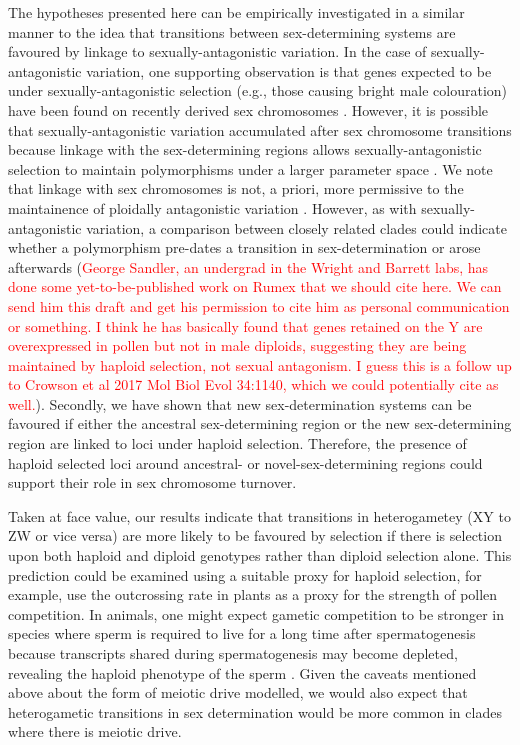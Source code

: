 \documentclass[12pt]{article}
\begin{document}
The hypotheses presented here can be empirically investigated in a similar manner to the idea that transitions between sex-determining systems are favoured by linkage to sexually-antagonistic variation. 
In the case of sexually-antagonistic variation, one supporting observation is that genes expected to be under sexually-antagonistic selection (e.g., those causing bright male colouration) have been found on recently derived sex chromosomes \citep{Lindholm:2002dw,Tripathi:2009cw,Ser:2010iq}.
However, it is possible that sexually-antagonistic variation accumulated after sex chromosome transitions because linkage with the sex-determining regions allows sexually-antagonistic selection to maintain polymorphisms under a larger parameter space \citep{Rice:1987hs,Jordan:2011fj}.
We note that linkage with sex chromosomes is not, a priori, more permissive to the maintainence of ploidally antagonistic variation \citep{Immler:2012tl}.
However, as with sexually-antagonistic variation, a comparison between closely related clades could indicate whether a polymorphism pre-dates a transition in sex-determination or arose afterwards (\textcolor{red}{George Sandler, an undergrad in the Wright and Barrett labs, has done some yet-to-be-published work on Rumex that we should cite here. We can send him this draft and get his permission to cite him as personal communication or something. I think he has basically found that genes retained on the Y are overexpressed in pollen but not in male diploids, suggesting they are being maintained by haploid selection, not sexual antagonism. I guess this is a follow up to Crowson et al 2017 Mol Biol Evol 34:1140, which we could potentially cite as well.}). 
Secondly, we have shown that new sex-determination systems can be favoured if either the ancestral sex-determining region or the new sex-determining region are linked to loci under haploid selection. 
Therefore, the presence of haploid selected loci around ancestral- or novel-sex-determining regions could support their role in sex chromosome turnover. 

Taken at face value, our results indicate that transitions in heterogametey (XY to ZW or vice versa) are more likely to be favoured by selection if there is selection upon both haploid and diploid genotypes rather than diploid selection alone. 
This prediction could be examined using a suitable proxy for haploid selection, for example, \cite{Lenormand:2005vb} use the outcrossing rate in plants as a proxy for the strength of pollen competition. 
In animals, one might expect gametic competition to be stronger in species where sperm is required to live for a long time after spermatogenesis because transcripts shared during spermatogenesis may become depleted, revealing the haploid phenotype of the sperm \citep{Immler:2014im}. 
Given the caveats mentioned above about the form of meiotic drive modelled, we would also expect that heterogametic transitions in sex determination would be more common in clades where there is meiotic drive. 
\end{document}
